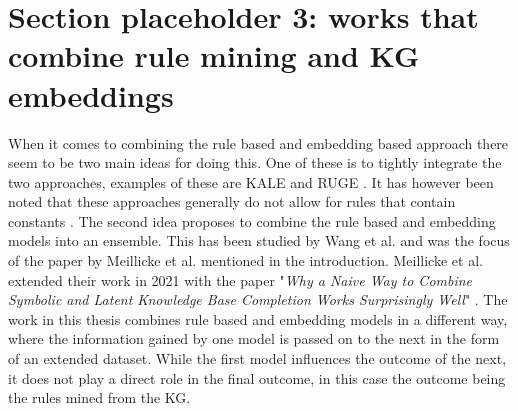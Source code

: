 \section{Section placeholder 3: works that combine rule mining and KG embeddings}
When it comes to combining the rule based and embedding based approach there seem to be two main ideas for doing this. One of these is to tightly integrate the two approaches, examples of these are KALE \cite{KALE} and RUGE \cite{RUGE}. It has however been noted that these approaches generally do not allow for rules that contain constants \cite{meilicke2021naive}. The second idea proposes to combine the rule based and embedding models into an ensemble. This has been studied by Wang et al. \cite{wang2018multi} and was the focus of the paper by Meillicke et al.\cite{ensemble} mentioned in the introduction. Meillicke et al. extended their work in 2021 with the paper "\textit{Why a Naive Way to Combine Symbolic and Latent Knowledge Base Completion Works Surprisingly Well}" \cite{meilicke2021naive}. The work in this thesis combines rule based and embedding models in a different way, where the information gained by one model is passed on to the next in the form of an extended dataset. While the first model influences the outcome of the next, it does not play a direct role in the final outcome, in this case the outcome being the rules mined from the KG.

